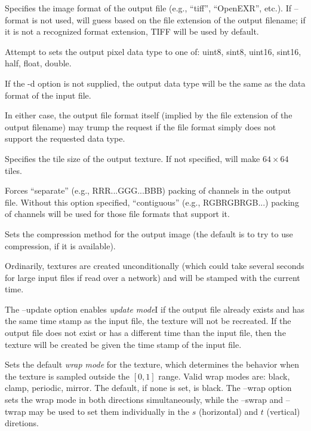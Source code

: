 Specifies the image format of the output file (e.g., ``tiff'',
``OpenEXR'', etc.).  If {\cf --format} is not used, \maketx will 
guess based on the file extension of the output filename; if it
is not a recognized format extension, TIFF will be used by default.
\apiend

Attempt to sets the output pixel data type to one of: {\cf uint8}, 
{\cf sint8}, {\cf uint16}, {\cf sint16}, {\cf half}, {\cf float}, 
{\cf double}.

If the {\cf -d} option is not supplied, the output data type will
be the same as the data format of the input file.

In either case, the output file format itself (implied by the file
extension of the output filename) may trump the request if the file
format simply does not support the requested data type.
\apiend

Specifies the tile size of the output texture.  If not specified,
\maketx will make $64 \times 64$ tiles.
\apiend

Forces ``separate'' (e.g., RRR...GGG...BBB) packing of channels in the
output file.  Without this option specified, ``contiguous'' (e.g.,
RGBRGBRGB...) packing of channels will be used for those file formats
that support it.
\apiend

\NEW Sets the compression method for the output image (the default is to try
to use  compression, if it is available).
\apiend

Ordinarily, textures are created unconditionally (which could take
several seconds for large input files if read over a network) and will
be stamped with the current time.

The {\cf --update} option enables \emph{update mode}I if the output file
already exists and has the same time stamp as the input file, the
texture will not be recreated.  If the output file does not exist or has
a different time than the input file, then the texture will be created
be given the time stamp of the input file.
\apiend

Sets the default \emph{wrap mode} for the texture, which determines
the behavior when the texture is sampled outside the $[0,1]$ range.
Valid wrap modes are: {\cf black}, {\cf clamp}, {\cf periodic},
{\cf mirror}.  The default, if none is set, is {\cf black}.  The
{\cf --wrap} option sets the wrap mode in both directions
simultaneously, while the {\cf --swrap} and {\cf --twrap} may be used to
set them individually in the $s$ (horizontal) and $t$ (vertical)
diretions.


